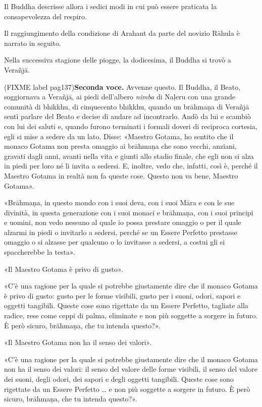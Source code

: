 

 Il Buddha descrisse allora i sedici modi in cui può
essere praticata la consapevolezza del respiro.


 Il raggiungimento della condizione di Arahant da parte
del novizio Rāhula è narrato in seguito.


 Nella successiva stagione delle piogge, la
dodicesima, il Buddha si trovò a Verañjā.


(FIXME label pag137)\textbf{Seconda voce.} Avvenne questo. Il Buddha, il Beato, soggiornava a
Verañjā, ai piedi dell’albero \emph{nimba} di Naḷeru con una grande comunità
di bhikkhu, di cinquecento bhikkhu, quando un brāhmaṇa di Verañjā sentì
parlare del Beato e decise di andare ad incontrarlo. Andò da lui e
scambiò con lui dei saluti e, quando furono terminati i formali doveri
di reciproca cortesia, egli si mise a sedere da un lato. Disse: «Maestro
Gotama, ho sentito che il monaco Gotama non presta omaggio ai brāhmaṇa
che sono vecchi, anziani, gravati dagli anni, avanti nella vita e giunti
allo stadio finale, che egli non si alza in piedi per loro né li invita
a sedersi. E, inoltre, vedo che, infatti, così è, perché il Maestro
Gotama in realtà non fa queste cose. Questo non va bene, Maestro
Gotama».


«Brāhmaṇa, in questo mondo con i suoi deva, con i suoi Māra e con le sue
divinità, in questa generazione con i suoi monaci e brāhmaṇa, con i suoi
principi e uomini, non vedo nessuno al quale io possa prestare omaggio o
per il quale alzarmi in piedi o invitarlo a sedersi, perché se un Essere
Perfetto prestasse omaggio o si alzasse per qualcuno o lo invitasse a
sedersi, a costui gli si spaccherebbe la testa».


«Il Maestro Gotama è privo di gusto».


«C’è una ragione per la quale si potrebbe giustamente dire che il monaco
Gotama è privo di gusto: gusto per le forme visibili, gusto per i suoni,
odori, sapori e oggetti tangibili. Queste cose sono rigettate da un
Essere Perfetto, tagliate alla radice, rese come ceppi di palma,
eliminate e non più soggette a sorgere in futuro. È però sicuro,
brāhmaṇa, che tu intenda questo?».


«Il Maestro Gotama non ha il senso dei valori».


«C’è una ragione per la quale si potrebbe giustamente dire che il monaco
Gotama non ha il senso dei valori: il senso del valore delle forme
visibili, il senso del valore dei suoni, degli odori, dei sapori e degli
oggetti tangibili. Queste cose sono rigettate da un Essere Perfetto … e
non più soggette a sorgere in futuro. È però sicuro, brāhmaṇa, che tu
intenda questo?».


